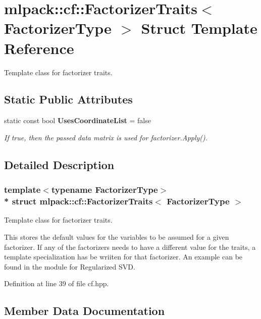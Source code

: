 \section{mlpack\+:\+:cf\+:\+:Factorizer\+Traits$<$ Factorizer\+Type $>$ Struct Template Reference}
\label{structmlpack_1_1cf_1_1FactorizerTraits}


Template class for factorizer traits.  


\subsection*{Static Public Attributes}
\begin{DoxyCompactItemize}
\item 
static const bool {\bf Uses\+Coordinate\+List} = false
\begin{DoxyCompactList}\small\item\em If true, then the passed data matrix is used for factorizer.\+Apply(). \end{DoxyCompactList}\end{DoxyCompactItemize}


\subsection{Detailed Description}
\subsubsection*{template$<$typename Factorizer\+Type$>$\\*
struct mlpack\+::cf\+::\+Factorizer\+Traits$<$ Factorizer\+Type $>$}

Template class for factorizer traits. 

This stores the default values for the variables to be assumed for a given factorizer. If any of the factorizers needs to have a different value for the traits, a template specialization has be wriiten for that factorizer. An example can be found in the module for Regularized S\+VD. 

Definition at line 39 of file cf.\+hpp.



\subsection{Member Data Documentation}
